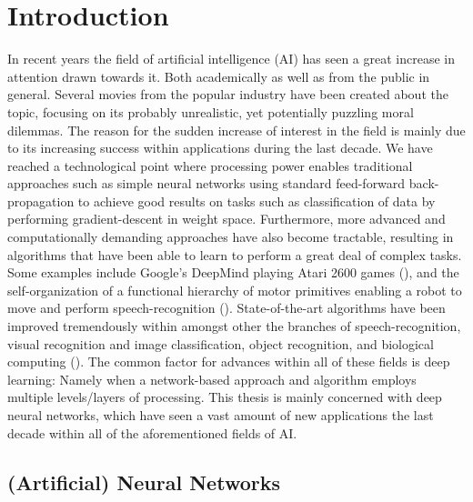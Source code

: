 
\chapter{Introduction}

In recent years the field of artificial intelligence (AI) has seen a great increase in attention drawn towards it. Both academically as well as from the public in general. Several movies from the popular industry have been created about the topic, focusing on its probably unrealistic, yet potentially puzzling moral dilemmas. The reason for the sudden increase of interest in the field is mainly due to its increasing success within applications during the last decade. We have reached a technological point where processing power enables traditional approaches such as simple neural networks using standard feed-forward back-propagation to achieve good results on tasks such as classification of data by performing gradient-descent in weight space. Furthermore, more advanced and computationally demanding approaches have also become tractable, resulting in algorithms that have been able to learn to perform a great deal of complex tasks. Some examples include Google's DeepMind playing Atari 2600 games (\cite{Mnih2015}), and the self-organization of a functional hierarchy of motor primitives enabling a robot to move and perform speech-recognition (\cite{Tani2014}). State-of-the-art algorithms have been improved tremendously within amongst other the branches of speech-recognition, visual recognition and image classification, object recognition, and biological computing (\cite{LeCun2015}). The common factor for advances within all of these fields is deep learning: Namely when a network-based approach and algorithm employs multiple levels/layers of processing. This thesis is mainly concerned with deep neural networks, which have seen a vast amount of new applications the last decade within all of the aforementioned fields of AI.

\section{(Artificial) Neural Networks}

